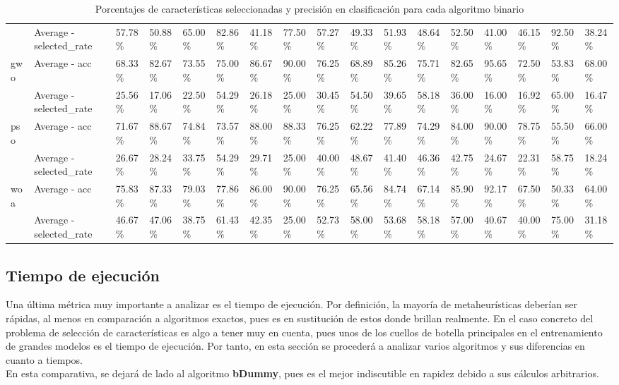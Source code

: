 \begin{table}
\begin{adjustbox}{width=\linewidth}
\begin{tabular}{lllllllllllllllll}
                      & Average - selected\_rate & 57.78\%       & 50.88\%     & 65.00\%  & 82.86\% & 41.18\%    & 77.50\% & 57.27\%    & 49.33\% & 51.93\%      & 48.64\%      & 52.50\%      & 41.00\% & 46.15\% & 92.50\% & 38.24\%\tabularnewline
            gwo       & Average - acc            & 68.33\%       & 82.67\%     & 73.55\%  & 75.00\% & 86.67\%    & 90.00\% & 76.25\%    & 68.89\% & 85.26\%      & 75.71\%      & 82.65\%      & 95.65\% & 72.50\% & 53.83\% & 68.00\%\tabularnewline
                      & Average - selected\_rate & 25.56\%       & 17.06\%     & 22.50\%  & 54.29\% & 26.18\%    & 25.00\% & 30.45\%    & 54.50\% & 39.65\%      & 58.18\%      & 36.00\%      & 16.00\% & 16.92\% & 65.00\% & 16.47\%\tabularnewline
            pso       & Average - acc            & 71.67\%       & 88.67\%     & 74.84\%  & 73.57\% & 88.00\%    & 88.33\% & 76.25\%    & 62.22\% & 77.89\%      & 74.29\%      & 84.00\%      & 90.00\% & 78.75\% & 55.50\% & 66.00\%\tabularnewline
                      & Average - selected\_rate & 26.67\%       & 28.24\%     & 33.75\%  & 54.29\% & 29.71\%    & 25.00\% & 40.00\%    & 48.67\% & 41.40\%      & 46.36\%      & 42.75\%      & 24.67\% & 22.31\% & 58.75\% & 18.24\%\tabularnewline
            woa       & Average - acc            & 75.83\%       & 87.33\%     & 79.03\%  & 77.86\% & 86.00\%    & 90.00\% & 76.25\%    & 65.56\% & 84.74\%      & 67.14\%      & 85.90\%      & 92.17\% & 67.50\% & 50.33\% & 64.00\%\tabularnewline
                      & Average - selected\_rate & 46.67\%       & 47.06\%     & 38.75\%  & 61.43\% & 42.35\%    & 25.00\% & 52.73\%    & 58.00\% & 53.68\%      & 58.18\%      & 57.00\%      & 40.67\% & 40.00\% & 75.00\% & 31.18\%\tabularnewline
            \bottomrule
        \end{tabular}
    \end{adjustbox}
    \caption{Porcentajes de características seleccionadas y precisión en clasificación para cada algoritmo binario}
    \label{tab:bin_red_acc_all}
\end{table}

\clearpage
\subsection{Tiempo de ejecución}
Una última métrica muy importante a analizar es el tiempo de ejecución. Por definición, la mayoría de metaheurísticas deberían ser rápidas, al menos en comparación a algoritmos exactos, pues es en sustitución de estos donde brillan realmente. En el caso concreto del problema de selección de características es algo a tener muy en cuenta, pues unos de los cuellos de botella principales en el entrenamiento de grandes modelos es el tiempo de ejecución. Por tanto, en esta sección se procederá a analizar varios algoritmos y sus diferencias en cuanto a tiempos.\\[6pt]
En esta comparativa, se dejará de lado al algoritmo \textbf{bDummy}, pues es el mejor indiscutible en rapidez debido a sus cálculos arbitrarios.

